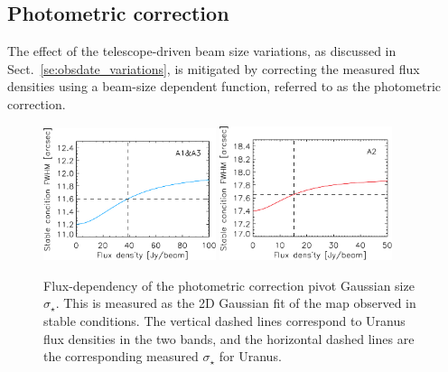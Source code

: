 \subsection{Photometric correction}%
\label{se:photometric_correction}

The effect of the telescope-driven beam size variations, as discussed
in Sect.~\ref{se:obsdate_variations}, is mitigated by correcting the measured flux
densities using a beam-size dependent function, referred to as the
photometric correction.

\begin{figure}[ht!]
  \begin{center}
    \includegraphics[clip=true, trim={0, -0.3cm, -0.3cm, 0}, width=0.45\textwidth]{Figures/Photocorr/FWHM_stable_empiric_ref_1mm.pdf}
    \includegraphics[clip=true, trim={0, -0.3cm, -0.3cm, 0}, width=0.45\textwidth]{Figures/Photocorr/FWHM_stable_empiric_ref_a2.pdf}
    \caption[Photometric correction pivot Gaussian
      size]{Flux-dependency of the photometric correction pivot
      Gaussian size $\sigma_\star$. This is measured as the 2D
      Gaussian fit of the map observed in stable conditions.
      The vertical dashed lines correspond to Uranus flux densities in
      the two bands, and the horizontal dashed lines are the
      corresponding measured
      $\sigma_\star$ for Uranus.}
    \label{fig:sigma_stable_vs_flux}
  \end{center}
\end{figure}

